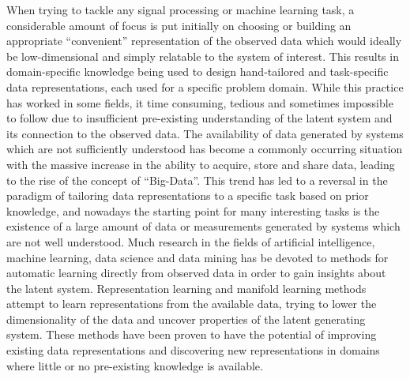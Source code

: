 	When trying to tackle any signal processing or machine learning task, a considerable amount of focus is put initially on choosing or building an appropriate “convenient” representation of the observed data which would ideally be low-dimensional and simply relatable to the system of interest. This results in domain-specific knowledge being used to design hand-tailored and task-specific data representations, each used for a specific problem domain. While this practice has worked in some fields, it time consuming, tedious and sometimes impossible to follow due to insufficient pre-existing understanding of the latent system and its connection to the observed data. The availability of data generated by systems which are not sufficiently understood has become a commonly occurring situation with the massive increase in the ability to acquire, store and share data, leading to the rise of the concept of “Big-Data”. This trend has led to a reversal in the paradigm of tailoring data representations to a specific task based on prior knowledge, and nowadays the starting point for many interesting tasks is the existence of a large amount of data or measurements generated by systems which are not well understood. Much research in the fields of artificial intelligence, machine learning, data science and data mining has be devoted to methods for automatic learning directly from observed data in order to gain insights about the latent system. Representation learning and manifold learning methods \cite{bengio2013representation} attempt to learn representations from the available data, trying to lower the dimensionality of the data and uncover properties of the latent generating system. These methods have been proven to have the potential of improving existing data representations and discovering new representations in domains where little or no pre-existing knowledge is available. 

